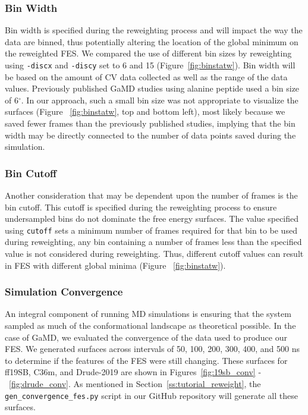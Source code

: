 \documentclass[9pt,tutorial]{livecoms}
\begin{document}
\subsubsection{Bin Width} 
Bin width is specified during the reweighting process and will impact the way the data are binned, thus potentially altering the location of the global minimum on the reweighted FES. We compared the use of different bin sizes by reweighting using \texttt{-discx} and \texttt{-discy} set to 6 and 15 (Figure~\ref{fig:binstatw}). Bin width will be based on the amount of CV data collected as well as the range of the data values. Previously published GaMD studies using alanine peptide used a bin size of 6$^{\circ}$.\cite{miao_gaussian_2015} In our approach, such a small bin size was not appropriate to visualize the surfaces (Figure ~\ref{fig:binstatw}, top and bottom left), most likely because we saved fewer frames than the previously published studies, implying that the bin width may be directly connected to the number of data points saved during the simulation.

\subsubsection{Bin Cutoff}
Another consideration that may be dependent upon the number of frames is the bin cutoff. This cutoff is specified during the reweighting process to ensure undersampled bins do not dominate the free energy surfaces. The value specified using \texttt{cutoff} sets a minimum number of frames required for that bin to be used during reweighting, any bin containing a number of frames less than the specified value is not considered during reweighting. Thus, different cutoff values can result in FES with different global minima (Figure ~\ref{fig:binstatw}).

\subsubsection{Simulation Convergence} 
An integral component of running MD simulations is ensuring that the system sampled as much of the conformational landscape as theoretical possible. In the case of GaMD, we evaluated the convergence of the data used to produce our FES. We generated surfaces across intervals of 50, 100, 200, 300, 400, and 500 ns to determine if the features of the FES were still changing. These surfaces for ff19SB, C36m, and Drude-2019 are shown in Figures~\ref{fig:19sb_conv} -~\ref{fig:drude_conv}. As mentioned in Section~\ref{ss:tutorial_reweight}, the \texttt{gen\_convergence\_fes.py} script in our GitHub repository will generate all these surfaces.
\end{document}
